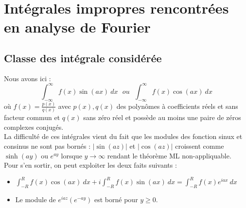 	
\section{Intégrales impropres rencontrées en analyse de Fourier}
\subsection{Classe des intégrale considérée}
Nous avons ici : 
\begin{equation}
	\int_{-\infty}^\infty f(x)\sin(ax)\ dx\ \ \ ou\ \ \ \int_{-\infty}^\infty f(x)\cos(ax)\ 
	dx
\end{equation}
où $f(x) = \frac{p(x)}{q(x)}$ avec $p(x),q(x)$ des polynômes à coefficients réels et 
sans facteur commun et $q(x)$ sans zéro réel et possède au moins une paire de zéros 
complexes conjugés.\\
	
La difficulté de ces intégrales vient du fait que les modules des fonction sinux et 
consinus ne sont pas bornés : $|\sin(az)|$ et $|\cos(az)|$ croissent comme $\sinh(ay)$
ou $e^{ay}$ lorsque $y\rightarrow\infty$ rendant le théorème ML non-appliquable. \\
Pour 
s'en sortir, on peut exploiter les deux faits suivants :
\begin{itemize}
	\item $\int_{-R}^R f(x)\cos(ax)\ dx + i\int_{-R}^R f(x)\sin(ax)\ dx = \int_{-R}^R f(x)
	      e^{iax}\ dx$
	\item Le module de $e^{iaz}(e^{-ay})$ est borné pour $y\geq0$.
\end{itemize}
	
